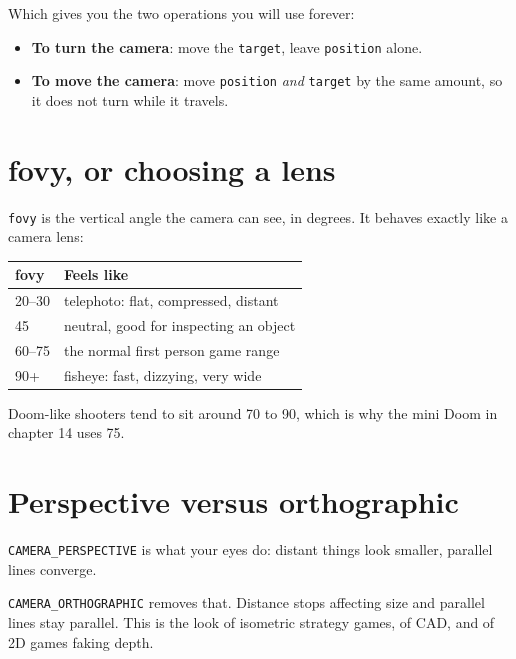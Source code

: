Which gives you the two operations you will use forever:

\begin{itemize}[leftmargin=*,itemsep=2pt]
  \item \textbf{To turn the camera}: move the \lstinline|target|, leave
        \lstinline|position| alone.
  \item \textbf{To move the camera}: move \lstinline|position| \emph{and}
        \lstinline|target| by the same amount, so it does not turn while it
        travels.
\end{itemize}


\section{fovy, or choosing a lens}

\lstinline|fovy| is the vertical angle the camera can see, in degrees. It behaves
exactly like a camera lens:

\begin{center}
\begin{tabular}{@{}ll@{}}
\toprule
\textbf{fovy} & \textbf{Feels like} \\
\midrule
20--30 & telephoto: flat, compressed, distant \\
45 & neutral, good for inspecting an object \\
60--75 & the normal first person game range \\
90+ & fisheye: fast, dizzying, very wide \\
\bottomrule
\end{tabular}
\end{center}

Doom-like shooters tend to sit around 70 to 90, which is why the mini Doom in
chapter 14 uses 75.

\section{Perspective versus orthographic}

\lstinline|CAMERA_PERSPECTIVE| is what your eyes do: distant things look smaller,
parallel lines converge.

\lstinline|CAMERA_ORTHOGRAPHIC| removes that. Distance stops affecting size and
parallel lines stay parallel. This is the look of isometric strategy games, of
CAD, and of 2D games faking depth.

